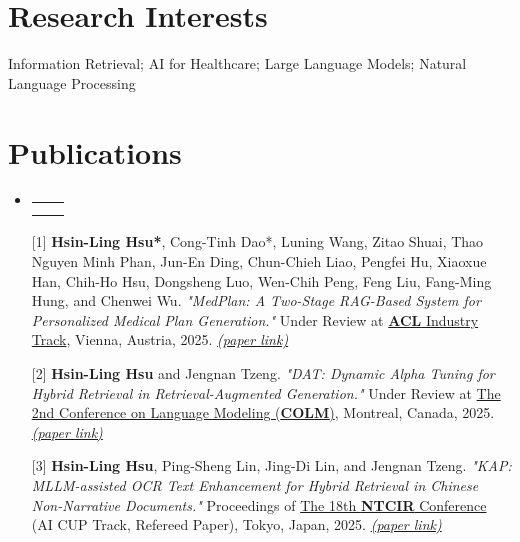 \documentclass[letterpaper,10pt]{article}
\makeatletter
\newcommand{\resumeSubheading}[4]{
  \vspace{-2pt}\item
    \begin{tabular*}{0.97\textwidth}[t]{l@{\extracolsep{\fill}}r}
      \textbf{#1} & #2 \\
      \textit{\small#3} & \textit{\small #4} \\
    \end{tabular*}\vspace{-7pt}
}
\newcommand{\resumeSubHeadingListStart}{\begin{itemize}[leftmargin=0.15in, label={}]}
\newcommand{\resumeSubHeadingListEnd}{\end{itemize}}
\makeatother
\begin{document}
\section{Research Interests}
Information Retrieval; AI for Healthcare; Large Language Models; Natural Language Processing

\section{Publications}
\vspace{1pt}
\resumeSubHeadingListStart
  \resumeSubheading
    {\normalfont{}}{}{}{}
    \vspace{-16pt}

    {[1] \textbf{Hsin-Ling Hsu*}, Cong-Tinh Dao*, Luning Wang, Zitao Shuai, Thao Nguyen Minh Phan, Jun-En Ding, Chun-Chieh Liao, Pengfei Hu, Xiaoxue Han, Chih-Ho Hsu, Dongsheng Luo, Wen-Chih Peng, Feng Liu, Fang-Ming Hung, and Chenwei Wu. \textit{"MedPlan: A Two-Stage RAG-Based System for Personalized Medical Plan Generation."} 
        Under Review at \href{https://2025.aclweb.org/calls/industry_track/}{\textbf{ACL} Industry Track}, Vienna, Austria, 2025.} \href{https://arxiv.org/pdf/2503.17900}{\textit{(paper link)}}

    \vspace{5pt}

    {[2] \textbf{Hsin-Ling Hsu} and Jengnan Tzeng. \textit{"DAT: Dynamic Alpha Tuning for Hybrid Retrieval in Retrieval-Augmented Generation."} 
        Under Review at \href{https://colmweb.org/cfp.html}{The 2nd Conference on Language Modeling (\textbf{COLM})}, Montreal, Canada, 2025.} \href{https://arxiv.org/pdf/2503.23013}{\textit{(paper link)}}

    \vspace{5pt}

    {[3] \textbf{Hsin-Ling Hsu}, Ping-Sheng Lin, Jing-Di Lin, and Jengnan Tzeng. \textit{"KAP: MLLM-assisted OCR Text Enhancement for Hybrid Retrieval in Chinese Non-Narrative Documents."} Proceedings of \href{https://research.nii.ac.jp/ntcir/ntcir-18/conference.html}{The 18th \textbf{NTCIR} Conference} (AI CUP Track, Refereed Paper), Tokyo, Japan, 2025.} \href{https://arxiv.org/pdf/2503.08452}{\textit{(paper link)}}

\resumeSubHeadingListEnd

\end{document}
